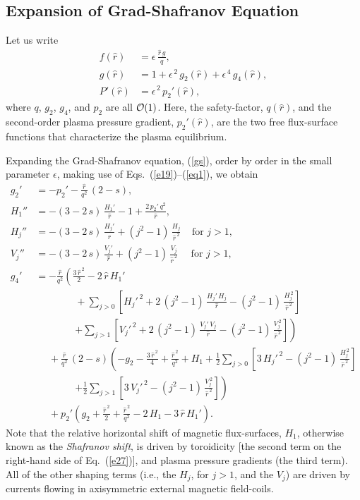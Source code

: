 \documentclass[12pt,prb,aps]{revtex4-1}
\begin{document}
\subsection{Expansion of Grad-Shafranov Equation}\label{exp}
Let us write
\begin{align}\label{e26v}
f(\hat{r})&= \epsilon\,\frac{\hat{r}\,g}{q},\\[0.5ex]
g(\hat{r}) &= 1+ \epsilon^{\,2}\,g_2(\hat{r}) + \epsilon^{\,4}\,g_4(\hat{r}),\label{e27v}\\[0.5ex]
P'(\hat{r}) &= \epsilon^{\,2}\,p_2'(\hat{r}),\label{eq1}
\end{align}
where $q$,  $g_2$, $g_4$, and $p_2$ are all ${\cal O}(1)$. Here, the safety-factor, $q(\hat{r})$, and the second-order plasma
pressure gradient, $p_2'(\hat{r})$, are the two free flux-surface functions that characterize the plasma equilibrium.\cite{gs1} 

Expanding the Grad-Shafranov equation, (\ref{gs}), order by order in the
small parameter $\epsilon$, making use of Eqs.~(\ref{e19})--(\ref{eq1}), we obtain\,\cite{con0,connor,gim,fitz2024}
\begin{align}
g_2'&=- p_2' - \frac{\hat{r}}{q^2}\,(2-s),\label{e26}\\[0.5ex]
H_1''&= -(3-2\,s)\,\frac{H_1' }{\hat{r}}
-1+\frac{2\,p_2'\,q^2}{\hat{r}},\label{e27}\\[0.5ex]
H_j''&= -(3-2\,s)\,\frac{H_j'}{\hat{r}}+(j^2-1)\,\frac{H_j}{\hat{r}^{\,2}}~~~~~\mbox{for $j>1$},\label{e33x}\\[0.5ex]
V_j''&= -(3-2\,s)\,\frac{V_j'}{\hat{r}}+(j^2-1)\,\frac{V_j}{\hat{r}^{\,2}}~~~~~~\mbox{for $j>1$},\label{e28}\\[0.5ex]
g_4'&= -\frac{\hat{r}}{q^2}\left(
\frac{3\,\hat{r}^{\,2}}{2}-2\,\hat{r}\,H_1'\right.\nonumber\\[0.5ex]
&\phantom{===}
+\sum_{j>0}\left[H_j'^{\,2}+2\,(j^2-1)\,\frac{H_j'\,H_j}{\hat{r}}-(j^2-1)\,\frac{H_j^{\,2}}{\hat{r}^{\,2}}\right]\nonumber\\[0.5ex]
&\phantom{===}\left.+\sum_{j>1}\left[V_j'^{\,2}+2\,(j^2-1)\,\frac{V_j'\,V_j}{\hat{r}}-(j^2-1)\,\frac{V_j^{\,2}}{\hat{r}^{\,2}}\right]\right)\nonumber\\[0.5ex]
&\phantom{=}
+\frac{\hat{r}}{q^2}\,(2-s)\left(-g_2-\frac{3\,\hat{r}^{\,2}}{4} +\frac{\hat{r}^{\,2}}{q^2}+H_1 +\frac{1}{2}\sum_{j>0}\left[3\,H_j'^{\,2}- (j^2-1)\,\frac{H_j^{\,2}}{\hat{r}^{\,2}}\right]
\right.\nonumber\\[0.5ex]
&\phantom{===}\left.+\frac{1}{2}\sum_{j>1}\left[3\,V_j'^{\,2}- (j^2-1)\,\frac{V_j^{\,2}}{\hat{r}^{\,2}}\right]\right)\nonumber\\[0.5ex]
&\phantom{=}
+p_2'\left(g_2+\frac{\hat{r}^{\,2}}{2}+\frac{\hat{r}^{\,2}}{q^2}-2\,H_1-3\,\hat{r}\,H_1'\right).\label{e31}
\end{align}
Note that the relative horizontal shift of magnetic flux-surfaces, $H_1$, otherwise known as the {\em Shafranov shift},\cite{shaf} is driven by toroidicity [the second term on
the right-hand side of Eq.~(\ref{e27})], and plasma pressure gradients (the third term). All of the other shaping terms (i.e., the $H_j$, for $j>1$, and
the $V_j$) are driven by currents flowing in axisymmetric external  magnetic field-coils.\cite{fitz2024} 
\end{document}
